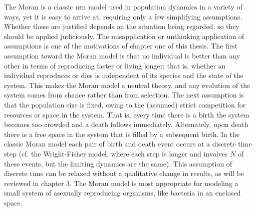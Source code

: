 The Moran is a classic urn model used in population dynamics in a variety of ways, yet it is easy to arrive at, requiring only a few simplifying assumptions. 
Whether these are justified depends on the situation being regarded, so they should be applied judiciously. 
The misapplication or unthinking application of assumptions is one of the motivations of chapter one of this thesis. %
The first assumption toward the Moran model is that no individual is better than any other in terms of reproducing faster or living longer; that is, whether an individual reproduces or dies is independent of its species and the state of the system. %
This makes the Moran model a neutral theory, and any evolution of the system comes from chance rather than from selection.
The next assumption is that the population size is fixed, owing to the (assumed) strict competition for resources or space in the system. 
That is, every time there is a birth the system becomes too crowded and a death follows immediately. Alternately, upon death there is a free space in the system that is filled by a subsequent birth.
In the classic Moran model each pair of birth and death event occurs at a discrete time step (cf. the Wright-Fisher model, where each step is longer and involves $N$ of these events, but the limiting dynamics are the same). 
This assumption of discrete time can be relaxed without a qualitative change in results, as will be reviewed in chapter 3. %
The Moran model is most appropriate for modeling a small system of asexually reproducing organisms, like bacteria in an enclosed space. %

